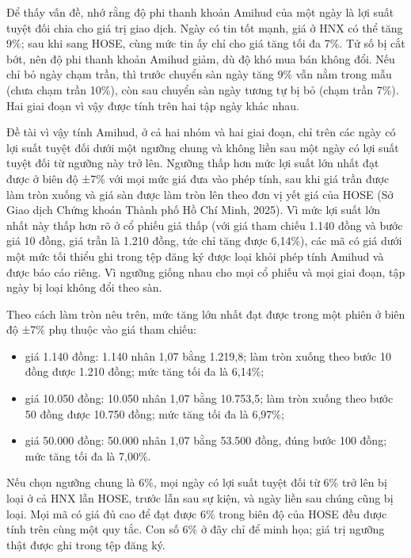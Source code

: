 Để thấy vấn đề, nhớ rằng độ phi thanh khoản Amihud của một ngày là lợi suất tuyệt đối chia cho giá trị giao dịch. Ngày có tin tốt mạnh, giá ở HNX có thể tăng 9\%; sau khi sang HOSE, cùng mức tin ấy chỉ cho giá tăng tối đa 7\%. Tử số bị cắt bớt, nên độ phi thanh khoản Amihud giảm, dù độ khó mua bán không đổi. Nếu chỉ bỏ ngày chạm trần, thì trước chuyển sàn ngày tăng 9\% vẫn nằm trong mẫu (chưa chạm trần 10\%), còn sau chuyển sàn ngày tương tự bị bỏ (chạm trần 7\%). Hai giai đoạn vì vậy được tính trên hai tập ngày khác nhau.

Đề tài vì vậy tính Amihud, ở cả hai nhóm và hai giai đoạn, chỉ trên các ngày có lợi suất tuyệt đối dưới một ngưỡng chung và không liền sau một ngày có lợi suất tuyệt đối từ ngưỡng này trở lên. Ngưỡng thấp hơn mức lợi suất lớn nhất đạt được ở biên độ ±7\% với mọi mức giá đưa vào phép tính, sau khi giá trần được làm tròn xuống và giá sàn được làm tròn lên theo đơn vị yết giá của HOSE (Sở Giao dịch Chứng khoán Thành phố Hồ Chí Minh, 2025). Vì mức lợi suất lớn nhất này thấp hơn rõ ở cổ phiếu giá thấp (với giá tham chiếu 1.140 đồng và bước giá 10 đồng, giá trần là 1.210 đồng, tức chỉ tăng được 6,14\%), các mã có giá dưới một mức tối thiểu ghi trong tệp đăng ký được loại khỏi phép tính Amihud và được báo cáo riêng. Vì ngưỡng giống nhau cho mọi cổ phiếu và mọi giai đoạn, tập ngày bị loại không đổi theo sàn.

\begin{vidu}
Theo cách làm tròn nêu trên, mức tăng lớn nhất đạt được trong một phiên ở biên độ ±7\% phụ thuộc vào giá tham chiếu:
\begin{itemize}
\item giá 1.140 đồng: 1.140 nhân 1,07 bằng 1.219,8; làm tròn xuống theo bước 10 đồng được 1.210 đồng; mức tăng tối đa là 6,14\%;
\item giá 10.050 đồng: 10.050 nhân 1,07 bằng 10.753,5; làm tròn xuống theo bước 50 đồng được 10.750 đồng; mức tăng tối đa là 6,97\%;
\item giá 50.000 đồng: 50.000 nhân 1,07 bằng 53.500 đồng, đúng bước 100 đồng; mức tăng tối đa là 7,00\%.
\end{itemize}
Nếu chọn ngưỡng chung là 6\%, mọi ngày có lợi suất tuyệt đối từ 6\% trở lên bị loại ở cả HNX lẫn HOSE, trước lẫn sau sự kiện, và ngày liền sau chúng cũng bị loại. Mọi mã có giá đủ cao để đạt được 6\% trong biên độ của HOSE đều được tính trên cùng một quy tắc. Con số 6\% ở đây chỉ để minh họa; giá trị ngưỡng thật được ghi trong tệp đăng ký.
\end{vidu}

